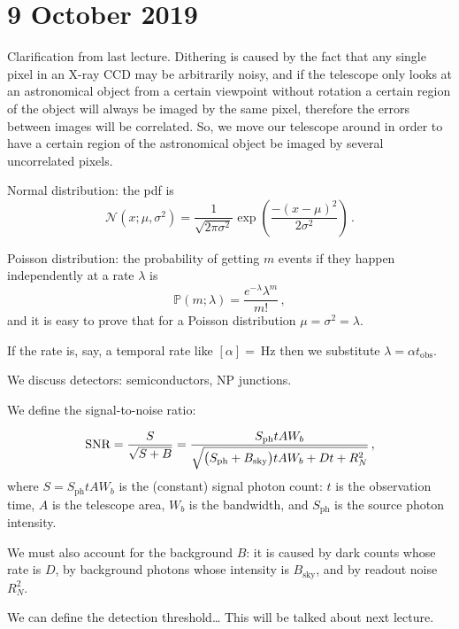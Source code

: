 \documentclass[main.tex]{subfiles}
\begin{document}
\section*{9 October 2019}

Clarification from last lecture.
Dithering is caused by the fact that any single pixel in an X-ray CCD may be arbitrarily noisy, and if the telescope only looks at an astronomical object from a certain viewpoint without rotation a certain region of the object will always be imaged by the same pixel, therefore the errors between images will be correlated.
So, we move our telescope around in order to have a certain region of the astronomical object be imaged by several uncorrelated pixels.

Normal distribution: the pdf is
%
\begin{equation}
  \mathcal N (x; \mu, \sigma^2) = \frac{1}{\sqrt{2 \pi \sigma^2}} \exp(\frac{-(x-\mu)^2}{2\sigma^2} ) \,.
\end{equation}

Poisson distribution: the probability of getting \(m\) events if they happen independently at a rate \(\lambda\) is
%
\begin{equation}
\mathbb{P} (m ; \lambda) = \frac{e^{-\lambda} \lambda^m}{m!} \,,
\end{equation}
%
and it is easy to prove that for a Poisson distribution \(\mu = \sigma^2 = \lambda\).

If the rate is, say, a temporal rate like \([\alpha] = \SI{}{\hertz}\) then we substitute \(\lambda = \alpha t_{\text{obs}}\).

We discuss detectors: semiconductors, NP junctions.

We define the signal-to-noise ratio:

\begin{equation}
	\text{SNR} = \frac{S}{\sqrt{S + B}}
	= \frac{S_{\text{ph}} t A W_b}{\sqrt{\qty(S_{\text{ph}} + B_\text{sky})tAW_b + Dt + R^2_N } }\,,
\end{equation}
%
where $S= S_{\text{ph}} tAW_b$ is the (constant) signal photon count: \(t\) is the observation time, \(A\) is the telescope area, \(W_b\) is the bandwidth, and \(S_{\text{ph}}\) is the source photon intensity.

We must also account for the background $B$: it is caused by dark counts whose rate is \(D\), by background photons whose intensity is \(B_{\text{sky}}\), and by readout noise \(R_N^2\).

We can define the detection threshold\dots
This will be talked about next lecture.
\end{document}
